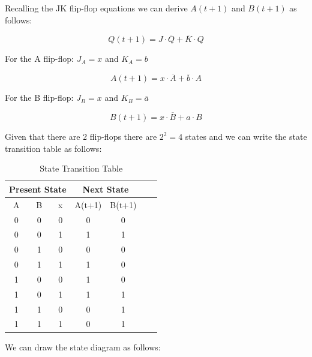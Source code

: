 \documentclass[table ]{article}
\begin{document}
    Recalling the JK flip-flop equations we can derive  \(A(t+1)\) and \(B(t+1)\) as follows:

    \begin{equation}
        Q(t + 1) = J \cdot \overline{Q} + \overline{K} \cdot Q
    \end{equation}

    For the A flip-flop: \(J_A = x\) and \(K_A = b\)

    \begin{equation}
        A(t + 1) = x \cdot \overline{A} + \overline{b} \cdot A
    \end{equation}

    For the B flip-flop: \(J_B = x \) and \(K_B = \overline{a}\)

    \begin{equation}
        B(t + 1) = x \cdot \overline{B} + a \cdot B
    \end{equation}

    Given that there are 2 flip-flops there are \(2^2 = 4\) states and we can write the state transition table as follows:

    \begin{table}[H]
        \centering
        \caption{State Transition Table}
        \begin{tabular}{|c|c|c|c|c|c|c|}
            \hline
            \multicolumn{3}{|c|}{Present State} & \multicolumn{2}{c|}{Next State} \\
            \hline
            A & B &x& A(t+1) & B(t+1)  \\
            \hline
            0 & 0 & 0 & 0 & 0 \\
            0 & 0 & 1 & 1 & 1 \\
            \hline
            0 & 1 & 0 & 0 & 0 \\
            0 & 1 & 1 & 1 & 0 \\
            \hline
            1 & 0 & 0 & 1 & 0 \\
            1 & 0 & 1 & 1 & 1 \\
            \hline
            1 & 1 & 0 & 0 & 1 \\
            1 & 1 & 1 & 0 & 1 \\

            \hline

            \hline
        \end{tabular}
    \end{table}


    We can draw the state diagram as follows:
\end{document}
